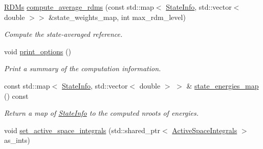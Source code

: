 \begin{DoxyCompactItemize}
\item 
\mbox{\hyperlink{classforte_1_1_r_d_ms}{R\+D\+Ms}} \mbox{\hyperlink{classforte_1_1_active_space_solver_ac109bd2bb723b8530a829b5dde97783b}{compute\+\_\+average\+\_\+rdms}} (const std\+::map$<$ \mbox{\hyperlink{classforte_1_1_state_info}{State\+Info}}, std\+::vector$<$ double $>$$>$ \&state\+\_\+weights\+\_\+map, int max\+\_\+rdm\+\_\+level)
\begin{DoxyCompactList}\small\item\em Compute the state-\/averaged reference. \end{DoxyCompactList}\item 
void \mbox{\hyperlink{classforte_1_1_active_space_solver_ae4b1ab93708d2ddb0b00a1f6df9e1fdf}{print\+\_\+options}} ()
\begin{DoxyCompactList}\small\item\em Print a summary of the computation information. \end{DoxyCompactList}\item 
const std\+::map$<$ \mbox{\hyperlink{classforte_1_1_state_info}{State\+Info}}, std\+::vector$<$ double $>$ $>$ \& \mbox{\hyperlink{classforte_1_1_active_space_solver_a7b3fec1838a74fa058d232c7b7dc6b4c}{state\+\_\+energies\+\_\+map}} () const
\begin{DoxyCompactList}\small\item\em Return a map of \mbox{\hyperlink{classforte_1_1_state_info}{State\+Info}} to the computed nroots of energies. \end{DoxyCompactList}\item 
void \mbox{\hyperlink{classforte_1_1_active_space_solver_aff170a7857b4887368d74e82847188d0}{set\+\_\+active\+\_\+space\+\_\+integrals}} (std\+::shared\+\_\+ptr$<$ \mbox{\hyperlink{classforte_1_1_active_space_integrals}{Active\+Space\+Integrals}} $>$ as\+\_\+ints)
\end{DoxyCompactItemize}

